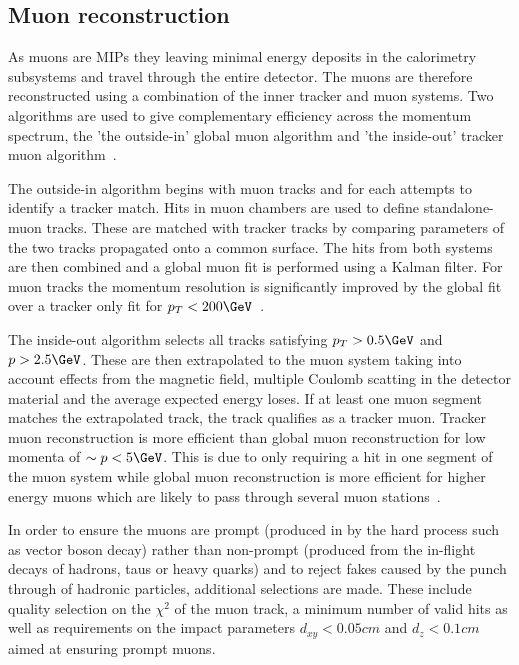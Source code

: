 \subsection{Muon reconstruction}
\label{muon_reco}

As muons are MIPs they leaving minimal energy deposits in the calorimetry
subsystems and travel through the entire detector. The muons are therefore reconstructed using a 
combination of the inner tracker and muon systems. Two algorithms are used to 
give complementary efficiency across the momentum spectrum, the 'the outside-in' 
global muon algorithm and 'the inside-out' tracker muon algorithm~\cite{muon_reco}.

The outside-in algorithm begins with muon tracks and for each attempts to
identify a tracker match. Hits in muon chambers are used to define standalone-muon tracks. 
These are matched with tracker tracks by comparing parameters of the two tracks propagated 
onto a common surface. The hits from both systems are then combined and a global muon fit 
is performed using a Kalman filter. For muon tracks the momentum resolution is significantly improved by 
the global fit over a tracker only fit for $p_T < 200\GeV$~\cite{CMS,muon_reco_cosmic}. 

The inside-out algorithm selects all tracks satisfying $p_T > 0.5\GeV$ and $p > 2.5\GeV$. These are then 
extrapolated to the muon system taking into account effects from the magnetic field, multiple Coulomb scatting
in the detector material and the average expected energy loses. If at least one muon segment matches 
the extrapolated track, the track qualifies as a tracker muon. Tracker muon reconstruction is more efficient
than global muon reconstruction for low momenta of $\sim p< 5\GeV$. This is due
to only requiring a hit in one segment of the muon system while global muon reconstruction is 
more efficient for higher energy muons which are likely to pass through several muon stations~\cite{muon_reco}.

In order to ensure the muons are prompt (produced in by the hard process such as vector boson decay) rather
than non-prompt (produced from the in-flight decays of hadrons, taus or heavy quarks) and to reject fakes
caused by the punch through of hadronic particles, additional selections are made. These include quality
selection on the $\chi^2$ of the muon track, a minimum number of valid hits as well as requirements
on the impact parameters $d_{xy} < 0.05 cm$ and $d_{z} < 0.1 cm$ aimed at ensuring prompt muons.

